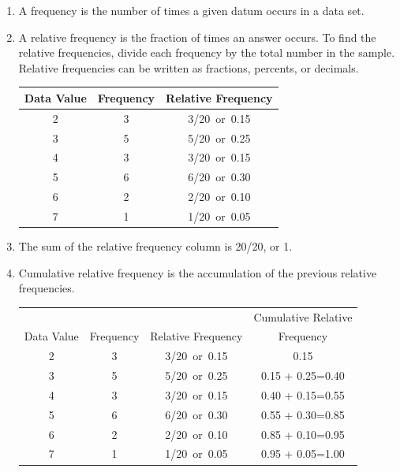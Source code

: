 \documentclass[11pt,a4paper]{article}
\theoremstyle{definition}
\begin{document}
\begin{enumerate}
\item[$\bullet$] A frequency is the number of times a given datum occurs in a data set.
\item[$\bullet$] A relative frequency is the fraction of times an answer occurs. To find the relative frequencies, divide each frequency by the total number in the sample.\\
Relative frequencies can be written as fractions, percents, or decimals.

\begin{table}[H]
\centering
\begin{tabular}{|c|c|c|}
\hline
Data Value & Frequency & Relative Frequency\\
\hline
2 & 3 & 3/20\  or\  0.15\\
3 & 5 & 5/20\  or\  0.25\\
4 & 3 & 3/20\  or\  0.15\\
5 & 6 & 6/20\  or\  0.30\\
6 & 2 & 2/20\  or\  0.10\\
7 & 1 & 1/20\  or\  0.05\\
\hline
\end{tabular}
\end{table}

\item[$\bullet$] The sum of the relative frequency column is 20/20, or 1.
\item[$\bullet$] Cumulative relative frequency is the accumulation of the previous relative frequencies.
\begin{table}[H]
\centering
\begin{tabular}{|c|c|c|c|}
\hline
           &           &                    &  Cumulative Relative\\
Data Value & Frequency & Relative Frequency &  Frequency\\           
\hline
2 & 3 & 3/20\  or\  0.15 & 0.15\\
3 & 5 & 5/20\  or\  0.25 & 0.15 + 0.25=0.40\\
4 & 3 & 3/20\  or\  0.15 & 0.40 + 0.15=0.55\\
5 & 6 & 6/20\  or\  0.30 & 0.55 + 0.30=0.85\\
6 & 2 & 2/20\  or\  0.10 & 0.85 + 0.10=0.95\\
7 & 1 & 1/20\  or\  0.05 & 0.95 + 0.05=1.00\\
\hline
\end{tabular}
\end{table}
\end{enumerate}
\end{document}
